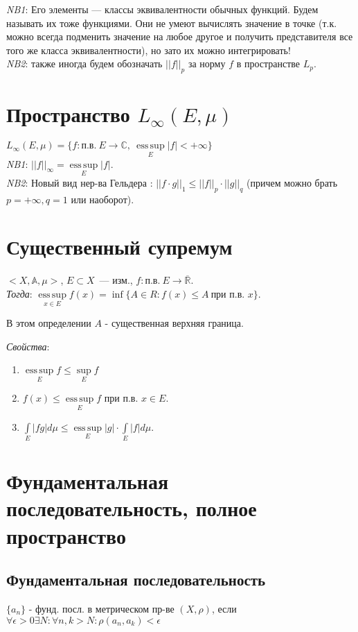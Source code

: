 \documentclass[paper=a4, fontsize=17pt]{article}
\DeclareMathOperator*{\esssup}{ess\, sup}
\begin{document}
	\emph{NB1}: Его элементы --- классы эквивалентности обычных функций. Будем называть их тоже функциями. Они не умеют вычислять значение в точке (т.к. можно всегда подменить значение на любое другое и получить представителя все того же класса эквивалентности), но зато их можно интегрировать!\\

	\emph{NB2}: также иногда будем обозначать $||f||_p$ за норму $f$ в пространстве $L_p$.

	\section{Пространство $L_{\infty}(E,\mu)$}
	$L_\infty(E, \mu) =\{f : \text{п.в.}\ E \rightarrow \mathbb{C},\ \esssup\limits_E |f| < +\infty \}$\\
	\emph{NB1}: $||f||_\infty = \esssup\limits_E |f|$.\\

	\emph{NB2}: Новый вид нер-ва Гельдера : $||f \cdot g||_1 \leq ||f||_p \cdot ||g||_q$ (причем можно брать $p = +\infty, q = 1$ или наоборот).

	\section{Существенный супремум}
	$<X, \mathds{A}, \mu>$, $E \subset X$~--- изм., $f : \text{п.в.}\ E \rightarrow \overline{\mathbb{R}}$.\\

	\emph{Тогда}: $\esssup\limits_{x \in E} f(x) = \inf \{A \in R : f(x) \leq A\ \text{при п.в. $x$}\}$.

	В этом определении $A$ - существенная верхняя граница.

	\emph{Свойства}:
	\begin{enumerate}
		\item
		$\esssup\limits_E f \leq \sup\limits_E f$

		\item
		$f(x) \leq \esssup\limits_E f$ при п.в. $x \in E$.

		\item
		$\int\limits_E |fg|d\mu \leq \esssup\limits_E |g| \cdot \int\limits_E |f|d\mu$.
	\end{enumerate}

	\section{Фундаментальная последовательность, полное пространство}
	\subsection{Фундаментальная последовательность}
	$\{a_n\}$ - фунд. посл. в метрическом пр-ве $(X, \rho)$, если $\forall \epsilon > 0 \exists N: \forall n, k > N: \rho(a_n, a_k) < \epsilon$
\end{document}
